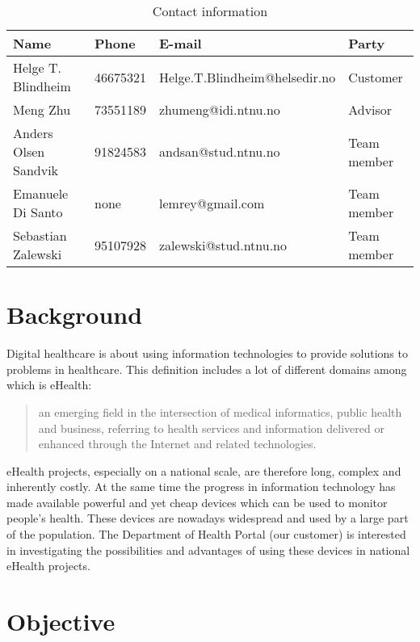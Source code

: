 \begin{table}[h]
\begin{center}
\begin{tabular}{ | l | l | l | p{2.5cm} | }
  \hline
  Name & Phone & E-mail & Party \\
  \hline\noalign{\smallskip}\hline
  Helge T. Blindheim	& 46675321		& Helge.T.Blindheim@helsedir.no		& Customer\\
  Meng Zhu				& 73551189		& zhumeng@idi.ntnu.no				& Advisor\\
  Anders Olsen Sandvik	& 91824583		& andsan@stud.ntnu.no				& Team member \\
  Emanuele Di Santo		& none			& lemrey@gmail.com					& Team member \\
  Sebastian Zalewski	& 95107928		& zalewski@stud.ntnu.no				& Team member \\
  \hline
\end{tabular}
\end{center}
\caption{Contact information}
\label{table:contact}
\end{table}

\section{Background}
\label{section:background}

Digital healthcare is about using information technologies to provide solutions to problems in healthcare.
This definition includes a lot of different domains among which is eHealth:
\begin{quote}
an emerging field in the intersection of medical informatics, public health and business, referring to health services
and information delivered or enhanced through the Internet and related technologies.\citep{ehealth}
\end{quote}
eHealth projects, especially on a national scale, are therefore long, complex and inherently costly.
At the same time the progress in information technology has made available powerful and yet cheap devices which
can be used to monitor people's health. These devices are nowadays widespread and used by a large part of the
population. The Department of Health Portal (our customer) is interested in investigating the
possibilities and advantages of using these devices in national eHealth projects.

\section{Objective}
\label{section:objective}

